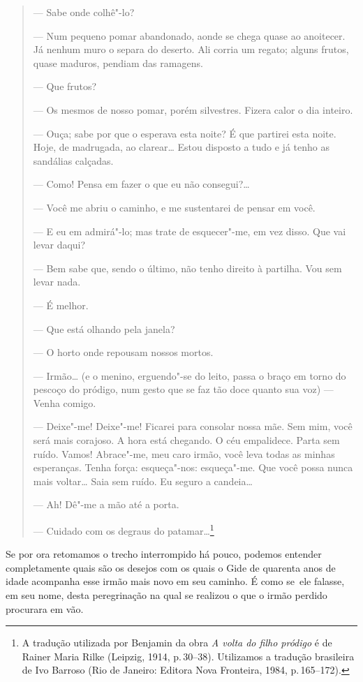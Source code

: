 \begin{quote}
--- Sabe onde colhê"-lo?

--- Num pequeno pomar abandonado, aonde se chega quase ao anoitecer. Já
nenhum muro o separa do deserto. Ali corria um regato; alguns frutos,
quase maduros, pendiam das ramagens.

--- Que frutos?

--- Os mesmos de nosso pomar, porém silvestres. Fizera calor o dia
inteiro.

--- Ouça; sabe por que o esperava esta noite? É que partirei esta noite.
Hoje, de madrugada, ao clarear\ldots{} Estou disposto a tudo e já tenho as
sandálias calçadas.

--- Como! Pensa em fazer o que eu não consegui?\ldots{}

--- Você me abriu o caminho, e me sustentarei de pensar em você.

--- E eu em admirá"-lo; mas trate de esquecer"-me, em vez disso. Que vai
levar daqui?

--- Bem sabe que, sendo o último, não tenho direito à partilha. Vou sem
levar nada.

--- É melhor.

--- Que está olhando pela janela?

--- O horto onde repousam nossos mortos.

--- Irmão\ldots{} (e o menino, erguendo"-se do leito, passa o braço em torno do
pescoço do pródigo, num gesto que se faz tão doce quanto sua voz) ---
Venha comigo.

--- Deixe"-me! Deixe"-me! Ficarei para consolar nossa mãe. Sem mim, você
será mais corajoso. A hora está chegando. O céu empalidece. Parta sem
ruído. Vamos! Abrace"-me, meu caro irmão, você leva todas as minhas
esperanças. Tenha força: esqueça"-nos: esqueça"-me. Que você possa nunca
mais voltar\ldots{} Saia sem ruído. Eu seguro a candeia\ldots{}

--- Ah! Dê"-me a mão até a porta.

--- Cuidado com os degraus do patamar\ldots{}\footnote{A tradução
  utilizada por Benjamin da obra \emph{A volta do filho pródigo} é de
  Rainer Maria Rilke (Leipzig, 1914, p.\,30--38). Utilizamos a tradução
  brasileira de Ivo Barroso (Rio de Janeiro: Editora Nova Fronteira,
  1984, p.\,165--172). \versal{[N.~T.]}}
  \end{quote}

Se por ora retomamos o trecho interrompido há pouco, podemos entender
completamente quais são os desejos com os quais o Gide de quarenta anos
de idade acompanha esse irmão mais novo em seu caminho. É como se~ele
falasse, em seu nome, desta peregrinação na qual se realizou o que o
irmão perdido procurara em vão.


